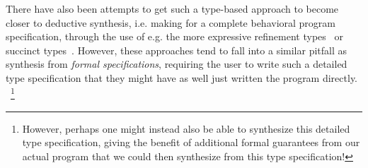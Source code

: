 \documentclass{article}
\begin{document}
There have also been attempts to get such a type-based approach to become closer to deductive synthesis,
i.e. making for a complete behavioral program specification,
through the use of e.g. the more expressive refinement types~\citep{synquid} or succinct types~\citep{guospeeding}.
However, these approaches tend to fall into a similar pitfall as synthesis from \emph{formal specifications},
requiring the user to write such a detailed type specification that they might have as well just written the program directly.%
~\footnote{
    However, perhaps one might instead also be able to synthesize this detailed type specification,
    giving the benefit of additional formal guarantees from our actual program that we could then synthesize from this type specification!
}




\end{document}
